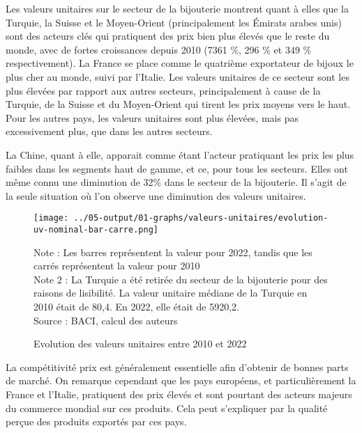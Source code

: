 \documentclass[french,10pt,a4paper]{article}
\begin{document}
Les valeurs unitaires sur le secteur de la bijouterie montrent quant à elles que la Turquie, la Suisse et le Moyen-Orient (principalement les Émirats arabes unis) sont des acteurs clés qui pratiquent des prix bien plus élevés que le reste du monde, avec de fortes croissances depuis 2010 (7361 \%, 296 \% et 349 \% respectivement). La France se place comme le quatrième exportateur de bijoux le plus cher au monde, suivi par l'Italie. Les valeurs unitaires de ce secteur sont les plus élevées par rapport aux autres secteurs, principalement à cause de la Turquie, de la Suisse et du Moyen-Orient qui tirent les prix moyens vers le haut. Pour les autres pays, les valeurs unitaires sont plus élevées, mais pas excessivement plus, que dans les autres secteurs. 

La Chine, quant à elle, apparait comme étant l'acteur pratiquant les prix les plus faibles dans les segments haut de gamme, et ce, pour tous les secteurs. Elles ont même connu une diminution de 32\% dans le secteur de la bijouterie. Il s'agit de la seule situation où l'on observe une diminution des valeurs unitaires.

\begin{figure}[!h]
  \centering
  \texttt{[image: ../05-output/01-graphs/valeurs-unitaires/evolution-uv-nominal-bar-carre.png]}
  \captionsetup{justification=justified, singlelinecheck=false, font=small}
  \caption*{Note : Les barres représentent la valeur pour 2022, tandis que les carrés représentent la valeur pour 2010 \\
  Note 2 : La Turquie a été retirée du secteur de la bijouterie pour des raisons de lisibilité. La valeur unitaire médiane de la Turquie en 2010 était de 80,4. En 2022, elle était de 5920,2. \\
  Source : BACI, calcul des auteurs}
  \captionsetup{justification=centering, singlelinecheck=true, font=normalsize}
  \caption{Evolution des valeurs unitaires entre 2010 et 2022}
  \label{fig:valeurs-unitaires}
\end{figure}

La compétitivité prix est généralement essentielle afin d'obtenir de bonnes parts de marché. On remarque cependant que les pays européens, et particulièrement la France et l'Italie, pratiquent des prix élevés et sont pourtant des acteurs majeurs du commerce mondial sur ces produits. Cela peut s'expliquer par la qualité perçue des produits exportés par ces pays.
\end{document}
